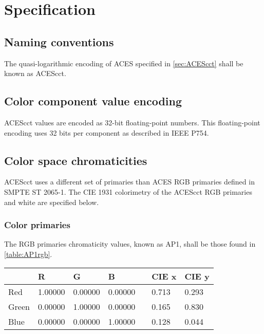 \regularsectionformat	%
\chapter{Specification}

\section{Naming conventions}
The quasi-logarithmic encoding of ACES specified in \autoref{sec:ACEScct} shall be known as ACEScct.

\section{Color component value encoding}
ACEScct values are encoded as 32-bit floating-point numbers. This floating-point encoding uses 32 bits per component as described in IEEE P754.

\section{Color space chromaticities}
\label{sec:colorspace}
ACEScct uses a different set of primaries than ACES RGB primaries defined in SMPTE ST 2065-1. The CIE 1931 colorimetry of the ACEScct RGB primaries and white are specified below.

\subsection{Color primaries}
The RGB primaries chromaticity values, known as AP1, shall be those found in \autoref{table:AP1rgb}.

\begin{center}
\begin{tabularx}{4.5in}{XlllXll}
        & R       & G       & B       & & CIE x & CIE y \\ \hline
Red     & 1.00000 & 0.00000 & 0.00000 & & 0.713 & 0.293 \\
Green   & 0.00000 & 1.00000 & 0.00000 & & 0.165 & 0.830 \\
Blue    & 0.00000 & 0.00000 & 1.00000 & & 0.128 & 0.044 \\
\end{tabularx}
\label{table:AP1rgb}
\end{center}

